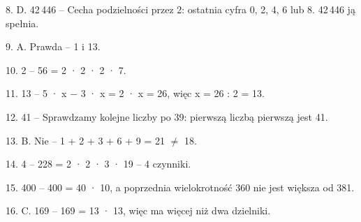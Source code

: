 8. D. 42\,446 {\color{szary}– Cecha podzielności przez 2: ostatnia cyfra 0, 2, 4, 6 lub 8. 42\,446 ją spełnia.}\par
9. A. Prawda {\color{szary}– 1 i 13.}\par
10. 2 {\color{szary}– 56 = 2 · 2 · 2 · 7.}\par
11. 13 {\color{szary}– 5 · x − 3 · x = 2 · x = 26, więc x = 26 : 2 = 13.}\par
12. 41 {\color{szary}– Sprawdzamy kolejne liczby po 39: pierwszą liczbą pierwszą jest 41.}\par
13. B. Nie {\color{szary}– 1 + 2 + 3 + 6 + 9 = 21 $\neq$ 18.}\par
14. 4 {\color{szary}– 228 = 2 · 2 · 3 · 19 – 4 czynniki.}\par
15. 400 {\color{szary}– 400 = 40 · 10, a poprzednia wielokrotność 360 nie jest większa od 381.}\par
16. C. 169 {\color{szary}– 169 = 13 · 13, więc ma więcej niż dwa dzielniki.}\par
\medskip